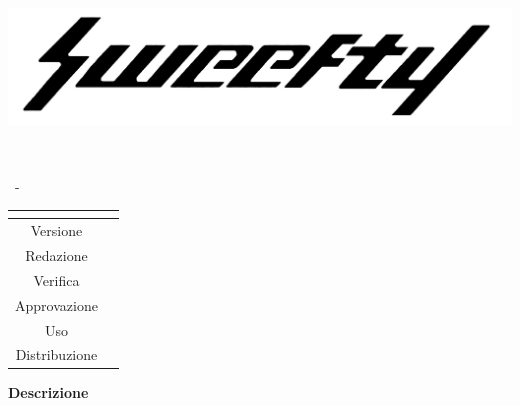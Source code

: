 \documentclass[a4paper, oneside, openany,12pt]{article}
\begin{document}
	\begin{titlepage}
		\begin{center}
			
			\begin{center}
				\centerline{\includegraphics[scale=0.24]{../../../CommonImages/logo.jpg}}
			\end{center}
			
			\vspace{1cm}
			
			\begin{Huge}
				\textbf{\Titolo{}} \\
			\end{Huge}
			
			\vspace{9pt}  
			
			\begin{large}
				\Gruppo{}\ - \Data{}
			\end{large}	  
			
			\vspace{15pt}
			
			\bgroup
			\def\arraystretch{1.3}
			\centering
			\begin{tabular}{c|L{5cm}}
				 \\ \hline
				Versione &  \Versione{}\\
				Redazione & \ACapoRedazione{} \\
				Verifica & \Verifica{} \\ 
				Approvazione & \Approvazione{} \ & \Uso \\
				Distribuzione & \Distribuzione{}
			\end{tabular}
			\egroup
			
			\vspace{15pt}
			
			\begin{center}
				\textbf{Descrizione\\}
				\DescrizioneDoc{}
			\end{center}
			
		\end{center}
	\end{titlepage}
	
\end{document}
